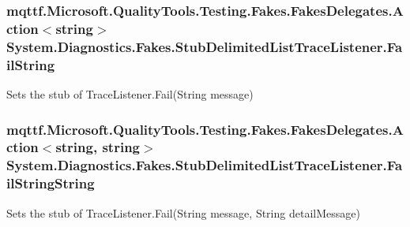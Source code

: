 \hypertarget{class_system_1_1_diagnostics_1_1_fakes_1_1_stub_delimited_list_trace_listener_ae6f2dcfccf32c5f70c40b23b7ba64179}{
\subsubsection[{Fail\-String}]{\setlength{\rightskip}{0pt plus 5cm}mqttf.\-Microsoft.\-Quality\-Tools.\-Testing.\-Fakes.\-Fakes\-Delegates.\-Action$<$string$>$ System.\-Diagnostics.\-Fakes.\-Stub\-Delimited\-List\-Trace\-Listener.\-Fail\-String}}\label{class_system_1_1_diagnostics_1_1_fakes_1_1_stub_delimited_list_trace_listener_ae6f2dcfccf32c5f70c40b23b7ba64179}


Sets the stub of Trace\-Listener.\-Fail(\-String message)

\hypertarget{class_system_1_1_diagnostics_1_1_fakes_1_1_stub_delimited_list_trace_listener_a308d522404b555ee9d0e7e6da22e2826}{
\subsubsection[{Fail\-String\-String}]{\setlength{\rightskip}{0pt plus 5cm}mqttf.\-Microsoft.\-Quality\-Tools.\-Testing.\-Fakes.\-Fakes\-Delegates.\-Action$<$string, string$>$ System.\-Diagnostics.\-Fakes.\-Stub\-Delimited\-List\-Trace\-Listener.\-Fail\-String\-String}}\label{class_system_1_1_diagnostics_1_1_fakes_1_1_stub_delimited_list_trace_listener_a308d522404b555ee9d0e7e6da22e2826}


Sets the stub of Trace\-Listener.\-Fail(\-String message, String detail\-Message)

